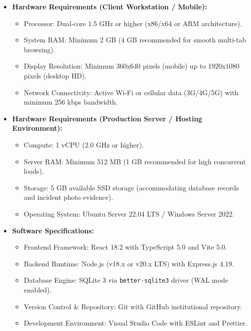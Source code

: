 \documentclass[10pt]{report}
\begin{document}
\begin{itemize}
\item \textbf{Hardware Requirements (Client Workstation / Mobile):}
  \begin{itemize}
  \item Processor: Dual-core 1.5 GHz or higher (x86/x64 or ARM architecture).
  \item System RAM: Minimum 2 GB (4 GB recommended for smooth multi-tab browsing).
  \item Display Resolution: Minimum 360x640 pixels (mobile) up to 1920x1080 pixels (desktop HD).
  \item Network Connectivity: Active Wi-Fi or cellular data (3G/4G/5G) with minimum 256 kbps bandwidth.
  \end{itemize}
\item \textbf{Hardware Requirements (Production Server / Hosting Environment):}
  \begin{itemize}
  \item Compute: 1 vCPU (2.0 GHz or higher).
  \item Server RAM: Minimum 512 MB (1 GB recommended for high concurrent loads).
  \item Storage: 5 GB available SSD storage (accommodating database records and incident photo evidence).
  \item Operating System: Ubuntu Server 22.04 LTS / Windows Server 2022.
  \end{itemize}
\item \textbf{Software Specifications:}
  \begin{itemize}
  \item Frontend Framework: React 18.2 with TypeScript 5.0 and Vite 5.0.
  \item Backend Runtime: Node.js (v18.x or v20.x LTS) with Express.js 4.19.
  \item Database Engine: SQLite 3 via \texttt{better-sqlite3} driver (WAL mode enabled).
  \item Version Control \& Repository: Git with GitHub institutional repository.
  \item Development Environment: Visual Studio Code with ESLint and Prettier.
  \end{itemize}
\end{itemize}
\end{document}
